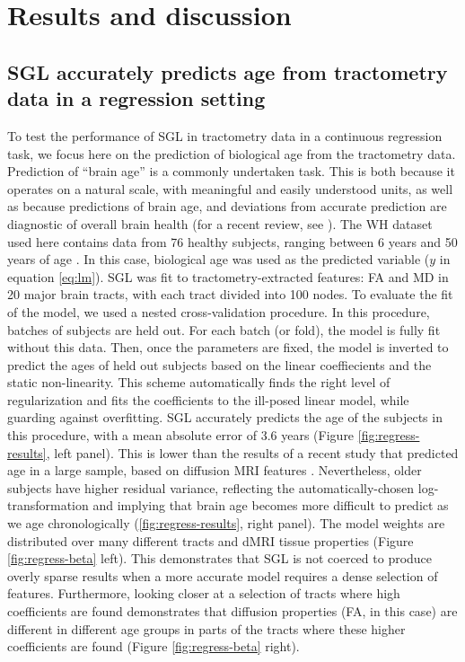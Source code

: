 \section*{Results and discussion}

\subsection*{SGL accurately predicts age from tractometry data in a regression setting}

To test the performance of SGL in tractometry data in a continuous regression
task, we focus here on the prediction of biological age from the tractometry
data. Prediction of ``brain age'' is a commonly undertaken task. This is both
because it operates on a natural scale, with meaningful and easily understood
units, as well as because predictions of brain age, and deviations from accurate
prediction are diagnostic of overall brain health (for a recent review, see
\cite{Cole2019-rz}). The WH dataset used here contains data from 76 healthy
subjects, ranging between 6 years and 50 years of age
\cite{yeatman2014lifespan}. In this case, biological age was used as the
predicted variable ($y$ in equation \ref{eq:lm}). SGL was fit to
tractometry-extracted features: FA and MD in 20 major brain tracts, with each
tract divided into 100 nodes. To evaluate the fit of the model, we used a nested
cross-validation procedure. In this procedure, batches of subjects are held out.
For each batch (or fold), the model is fully fit without this data. Then, once
the parameters are fixed, the model is inverted to predict the ages of held out
subjects based on the linear coeffiecients and the static non-linearity.
This scheme automatically finds the right level of regularization and
fits the coefficients to the ill-posed linear model, while guarding against
overfitting. SGL accurately predicts the age of the subjects in this procedure,
with a mean absolute error of 3.6 years (Figure \ref{fig:regress-results}, left
panel). This is lower than the results of a recent study that predicted age in a
large sample, based on diffusion MRI features \cite{Richard2018-ux}.
Nevertheless, older subjects have higher residual variance, reflecting the
automatically-chosen log-transformation and implying that brain age becomes more
difficult to predict as we age chronologically (\ref{fig:regress-results}, right
panel). The model weights are distributed over many different tracts and dMRI
tissue properties (Figure \ref{fig:regress-beta} left). This demonstrates that
SGL is not coerced to produce overly sparse results when a more accurate model
requires a dense selection of features. Furthermore, looking closer at a
selection of tracts where high coefficients are found demonstrates that
diffusion properties (FA, in this case) are different in different age groups in
parts of the tracts where these higher coefficients are found (Figure
\ref{fig:regress-beta} right).


